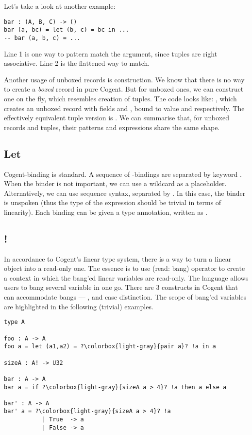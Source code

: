 \documentclass[a4paper]{article}
\newcommand{\cogent}{Cogent\xspace}
\begin{document}
Let's take a look at another example:
\begin{lstlisting}[language=Cogent]
bar : (A, B, C) -> ()
bar (a, bc) = let (b, c) = bc in ...
-- bar (a, b, c) = ...
\end{lstlisting}
Line 1 is one way to pattern match the argument, since tuples are right associative.
Line 2 is the flattened way to match.

Another usage of unboxed records is construction. We know that there is
no way to create a \emph{boxed} record in pure \cogent. But for unboxed ones,
we can construct one on the fly, which resembles creation of tuples. The code looks like:
, which creates an unboxed record with fields 
and , bound to value  and  respectively.
The effectively equivalent tuple version is .
We can summarise that, for unboxed records and tuples, their patterns and expressions 
share the same shape.

\subsection{Let} \label{ssec:letbang}
\cogent {}-binding is standard. A sequence of -bindings are separated
by keyword . When the binder is not important, we can use a wildcard \code{\_}
as a placeholder. Alternatively, we can use sequence syntax, separated by \code{;}. In this
case, the binder is unspoken (thus the type of the expression should be trivial in terms of
linearity). Each binding can be given a type annotation, written as . 

\subsection{!}
In accordance to \cogent's linear type system, there is a way to turn a linear
object into a read-only one. The essence is to use \code{!} (read: bang) operator to create a
context in which the bang'ed linear variables are read-only. The language allows users to
bang several variable in one go. There are 3 constructs in \cogent that can accommodate bangs ---
,  and case distinction. The scope of bang'ed variables are highlighted in the following
(trivial) examples.
\begin{lstlisting}[language=Cogent,escapechar=?]
type A

foo : A -> A
foo a = let (a1,a2) = ?\colorbox{light-gray}{pair a}? !a in a

sizeA : A! -> U32

bar : A -> A
bar a = if ?\colorbox{light-gray}{sizeA a > 4}? !a then a else a

bar' : A -> A
bar' a = ?\colorbox{light-gray}{sizeA a > 4}? !a
           | True  -> a
           | False -> a
\end{lstlisting}
\end{document}
